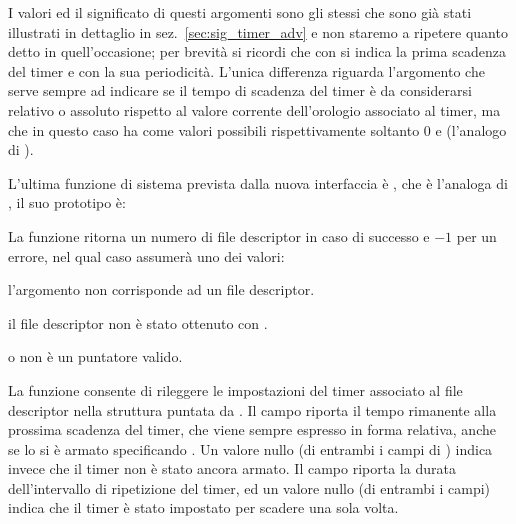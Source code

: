 I valori ed il significato di questi argomenti sono gli stessi che sono già
stati illustrati in dettaglio in sez.~\ref{sec:sig_timer_adv} e non staremo a
ripetere quanto detto in quell'occasione; per brevità si ricordi che
con  si indica la prima scadenza del timer e
con  la sua periodicità.  L'unica differenza
riguarda l'argomento  che serve sempre ad indicare se il tempo di
scadenza del timer è da considerarsi relativo o assoluto rispetto al valore
corrente dell'orologio associato al timer, ma che in questo caso ha come
valori possibili rispettivamente soltanto $0$ e 
(l'analogo di ).

L'ultima funzione di sistema prevista dalla nuova interfaccia è
, che è l'analoga di , il suo
prototipo è:

\begin{funcproto}{

}

{La funzione ritorna un numero di file descriptor in caso di successo e $-1$
  per un errore, nel qual caso  assumerà uno dei valori:
  \begin{errlist}
  \item[\errcode{EBADF}] l'argomento  non corrisponde ad un file
    descriptor. 
  \item[\errcode{EINVAL}] il file descriptor  non è stato ottenuto
    con .
  \item[\errcode{EFAULT}] o  non è un puntatore valido.
  \end{errlist}
}  
\end{funcproto}

La funzione consente di rileggere le impostazioni del timer associato al file
descriptor  nella struttura  puntata
da . Il campo  riporta il tempo rimanente
alla prossima scadenza del timer, che viene sempre espresso in forma relativa,
anche se lo si è armato specificando . Un valore
nullo (di entrambi i campi di ) indica invece che il timer non
è stato ancora armato. Il campo  riporta la durata
dell'intervallo di ripetizione del timer, ed un valore nullo (di entrambi i
campi) indica che il timer è stato impostato per scadere una sola volta.

